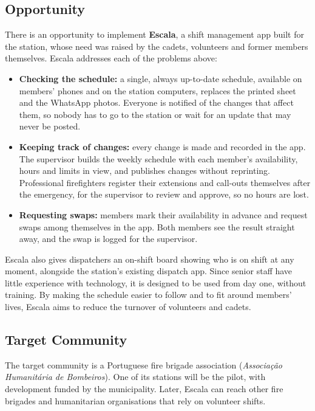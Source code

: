 \documentclass[11pt,a4paper]{article}
\begin{document}
\subsection{Opportunity}
There is an opportunity to implement \textbf{Escala}, a shift management app built for the
station, whose need was raised by the cadets, volunteers and former members themselves.
Escala addresses each of the problems above:
\begin{itemize}
  \item \textbf{Checking the schedule:} a single, always up-to-date schedule, available on
        members' phones and on the station computers, replaces the printed sheet and the
        WhatsApp photos. Everyone is notified of the changes that affect them, so nobody has
        to go to the station or wait for an update that may never be posted.
  \item \textbf{Keeping track of changes:} every change is made and recorded in the app. The
        supervisor builds the weekly schedule with each member's availability, hours and
        limits in view, and publishes changes without reprinting. Professional firefighters
        register their extensions and call-outs themselves after the emergency, for the
        supervisor to review and approve, so no hours are lost.
  \item \textbf{Requesting swaps:} members mark their availability in advance and request
        swaps among themselves in the app. Both members see the result straight away, and
        the swap is logged for the supervisor.
\end{itemize}

Escala also gives dispatchers an on-shift board showing who is on shift at any moment,
alongside the station's existing dispatch app. Since senior staff have little experience
with technology, it is designed to be used from day one, without training. By making the
schedule easier to follow and to fit around members' lives, Escala aims to reduce the
turnover of volunteers and cadets.

\subsection{Target Community}\label{sec:community}
The target community is a Portuguese fire brigade association (\emph{Associação
Humanitária de Bombeiros}). One of its stations will be the pilot, with development funded
by the municipality. Later, Escala can reach other fire brigades and humanitarian
organisations that rely on volunteer shifts.
\end{document}
